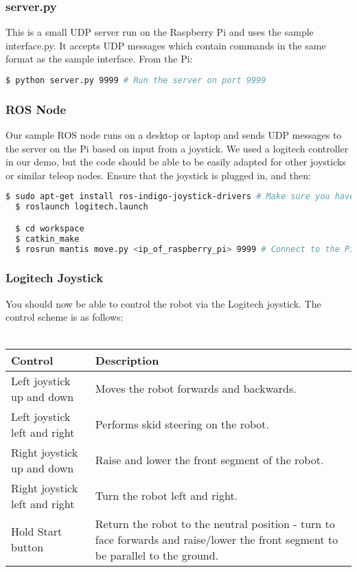 \documentclass[]{article}
\begin{document}
\subsubsection{server.py}
This is a small UDP server run on the Raspberry Pi and uses the sample interface.py. It accepts UDP messages which contain commands in the same format as the sample interface. From the Pi:
\begin{lstlisting}[language=bash]
  $ python server.py 9999 # Run the server on port 9999
\end{lstlisting}

\subsubsection{ROS Node}
Our sample ROS node runs on a desktop or laptop and sends UDP messages to the server on the Pi based on input from a joystick. We used a logitech controller in our demo, but the code should be able to be easily adapted for other joysticks or similar teleop nodes. Ensure that the joystick is plugged in, and then:
\begin{lstlisting}[language=bash]
  $ sudo apt-get install ros-indigo-joystick-drivers # Make sure you have the joystick drivers
  $ roslaunch logitech.launch

  $ cd workspace
  $ catkin_make
  $ rosrun mantis move.py <ip_of_raspberry_pi> 9999 # Connect to the Pi on port 9999
\end{lstlisting}

\subsubsection{Logitech Joystick}
You should now be able to control the robot via the Logitech joystick. The control scheme is as follows:
\\
\\
\begin{tabular}{ | l | p{7cm} | }
\hline
\textbf{Control} & \textbf{Description} \\ \hline
Left joystick up and down & Moves the robot forwards and backwards. \\ \hline
Left joystick left and right & Performs skid steering on the robot. \\ \hline
Right joystick up and down & Raise and lower the front segment of the robot. \\ \hline
Right joystick left and right & Turn the robot left and right. \\ \hline
Hold Start button & Return the robot to the neutral position - turn to face forwards and raise/lower the front segment to be parallel to the ground. \\ \hline
\end{tabular}
\end{document}
